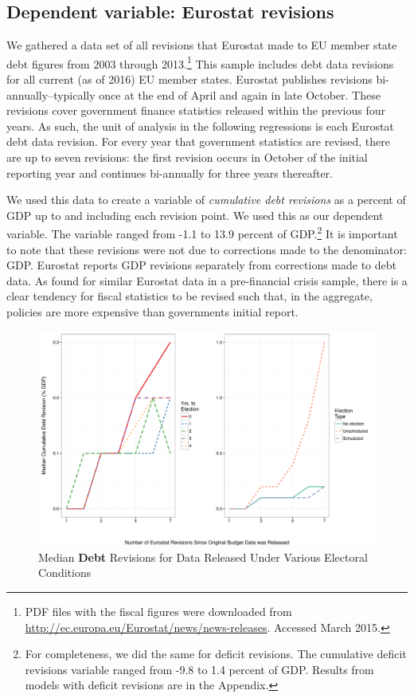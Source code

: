 \documentclass[]{article}
\begin{document}
\subsection{Dependent variable: Eurostat revisions}

We gathered a data set of all revisions that Eurostat made to EU member state debt figures from 2003 through 2013.\footnote{PDF files with the fiscal figures were downloaded from \url{http://ec.europa.eu/Eurostat/news/news-releases}. Accessed March 2015.} This sample includes debt data revisions for all current (as of 2016) EU member states. Eurostat publishes revisions bi-annually--typically once at the end of April and again in late October. These revisions cover government finance statistics released within the previous four years. As such, the unit of analysis in the following regressions is each Eurostat debt data revision. For every year that government statistics are revised, there are up to seven revisions: the first revision occurs in October of the initial reporting year and continues bi-annually for three years thereafter.

We used this data to create a variable of \emph{cumulative debt revisions} as a percent of GDP up to and including each revision point. We used this as our dependent variable. The variable ranged from -1.1 to 13.9 percent of GDP.\footnote{For completeness, we did the same for deficit revisions. The cumulative deficit revisions variable ranged from -9.8 to 1.4 percent of GDP. Results from models with deficit revisions are in the Appendix.} It is important to note that these revisions were not due to corrections  made to the denominator: GDP. Eurostat reports GDP revisions separately from corrections made to debt data. As \cite{DeCastro2013} found for similar Eurostat data in a pre-financial crisis sample, there is a clear tendency for fiscal statistics to be revised such that, in the aggregate, policies are more expensive than governments initial report.

\begin{figure}
    \begin{center}
        \caption{Median \textbf{Debt} Revisions for Data Released Under Various Electoral Conditions}
        \label{median_debt_revisions}
        \includegraphics[scale=0.55]{figures/median_debt_revisions.pdf}
    \end{center}
\end{figure}
\end{document}
